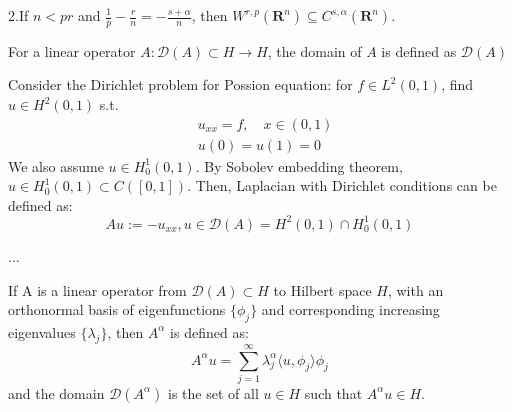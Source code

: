 \begin{theorem}
\begin{theorem}
    2.If $n<pr$ and $\frac{1}{p}-\frac{r}{n}=-\frac{s+\alpha}{n}$, then $W^{r, p}\left(\mathbf{R}^{n}\right) \subseteq C^{s,\alpha}\left(\mathbf{R}^{n}\right)$.

\end{theorem}

\begin{definition}
    For a linear operator $A:\mathcal{D}(A)\subset H\rightarrow H$, the domain of $A$ is defined as $\mathcal{D}(A)$
\end{definition}
\begin{theorem}
    Consider the Dirichlet problem for Possion equation: for $f\in L^2(0, 1)$, find $u\in H^2(0, 1)$ s.t.
    \begin{equation}
        \begin{aligned}
            &u_{xx} = f, \quad x\in (0, 1)\\
            &u(0) = u(1) = 0
        \end{aligned}
    \end{equation}
    We also assume $u\in H^1_0(0, 1)$. By Sobolev embedding theorem, $u\in H^1_0(0, 1)\subset C([0, 1])$. 
    Then, Laplacian with Dirichlet conditions can be defined as:
    \begin{equation}
        Au:=-u_{xx}, u\in \mathcal{D}(A)=H^2(0,1)\cap H_0^1(0,1)
    \end{equation}
\end{theorem}


\begin{definition}
    ...
\end{definition}

\begin{definition}
    If A is a linear operator from $\mathcal{D}(A) \subset H$ to Hilbert space $H$, with an orthonormal basis of eigenfunctions $\{\phi_j\}$ 
    and corresponding increasing eigenvalues $\{\lambda_j\}$, 
    then $A^{\alpha}$ is defined as:
    \begin{equation}
        A^{\alpha}u = \sum_{j=1}^\infty \lambda_j^\alpha \langle u, \phi_j\rangle \phi_j
    \end{equation}
    and the domain $\mathcal{D}(A^{\alpha})$ is the set of all $u\in H$ such that $A^{\alpha}u\in H$.
\end{definition}


\end{theorem}

